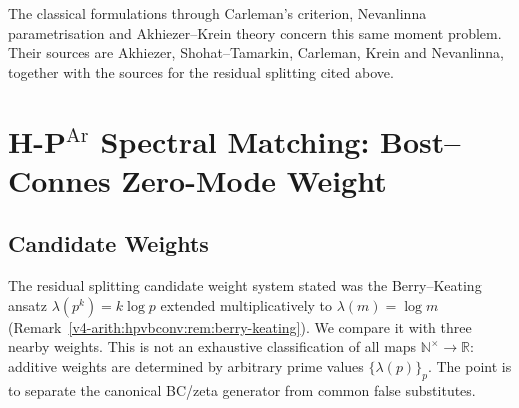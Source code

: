 The classical formulations through Carleman's criterion,
Nevanlinna parametrisation and Akhiezer--Krein theory concern this
same moment problem. Their sources are Akhiezer,
Shohat--Tamarkin, Carleman, Krein and Nevanlinna, together with the
sources for the residual splitting cited above.

\section{H-P\(^{\mathrm{Ar}}\) Spectral Matching: Bost--Connes Zero-Mode Weight}
\label{v4-arith:hpar-det:weight-selection}

\subsection{Candidate Weights}
\label{v4-arith:hpar-det:candidate-weights}

The residual splitting candidate weight system stated was the Berry--Keating
ansatz \(\lambda(p^{k})=k\log p\) extended multiplicatively to
\(\lambda(m)=\log m\) (Remark~\ref{v4-arith:hpvbconv:rem:berry-keating}). We
compare it with three nearby weights. This is not an
exhaustive classification of all maps
\(\mathbb{N}^{\times}\to\mathbb{R}\): additive weights are determined
by arbitrary prime values \(\{\lambda(p)\}_{p}\). The point is to
separate the canonical BC/zeta generator from common false
substitutes.

